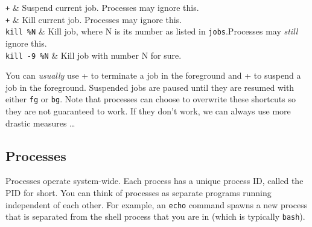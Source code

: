 \documentclass{TheAlternativeCourse}
\begin{document}
\begin{table}[H]
    \centering
    \begin{tcolorbox}[%
        enhanced,
        fuzzy shadow={1mm}{-1mm}{0mm}{0.1mm}{black!50!white},
        width=1.0\linewidth,
        tabularx={>{\centering\arraybackslash}l|>{\centering\arraybackslash}X},
        title={Controlling jobs}]
		\texttt{\keys{\ctrl}+} & Suspend current job. Processes may ignore this.\\
		\texttt{\keys{\ctrl}+} & Kill current job. Processes may ignore this.\\
        \texttt{kill \%N} & Kill job, where N is its number as listed in
        \texttt{jobs}.Processes may \emph{still} ignore this.\\
	    \texttt{kill -9 \%N} & Kill job with number N for sure.\\
    \end{tcolorbox}
    \label{tab8}
\end{table}

You can \emph{usually} use \keys{\ctrl}+ to terminate a job in the
foreground and \keys{\ctrl}+ to suspend a job in the foreground.
Suspended jobs are paused until they are resumed with either \texttt{fg} or
\texttt{bg}. Note that processes can choose to overwrite these shortcuts so
they are not guaranteed to work. If they don't work, we can always use more
drastic measures \ldots

\subsection{Processes}

Processes operate system-wide. Each process has a unique process ID, called the
PID for short. You can think of processes as separate programs running
independent of each other. For example, an \texttt{echo} command spawns a new
process that is separated from the shell process that you are in (which is
typically \texttt{bash}).
\end{document}
